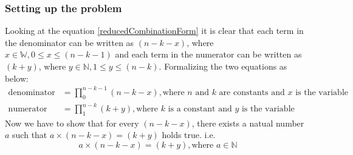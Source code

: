 \documentclass[12pt, twoside]{article}
\begin{document}
\subsubsection{Setting up the problem}\label{settingUpTheProblem}
Looking at the equation \eqref{reducedCombinationForm} it is clear that each term in the denominator can be written as $(n-k-x)$, where $x \in \mathbb{W}, 0 \leq x \leq (n-k-1)$ and each term in the numerator can be written as $(k+y)$, where $y \in \mathbb{N}, 1 \leq y \leq (n-k)$. Formalizing the two equations as below:
\begin{align}
	\text{denominator} &= \prod_{0}^{n-k-1}(n-k-x), \text{where $n$ and $k$ are constants and $x$ is the variable} \label{denominator}\\
	\text{numerator} &= \prod_{1}^{n-k}(k+y), \text{where $k$ is a constant and $y$ is the variable} \label{numerator}
\end{align}
Now we have to show that for every $(n-k-x)$, there exists a natual number \textbf{$a$} such that $a \times (n-k-x) = (k+y)$ holds true. i.e.
\begin{equation}
	a \times (n-k-x) = (k+y), \text{where $a \in \mathbb{N}$}  \label{MultipleOfAisAnswer}
\end{equation}
\end{document}
